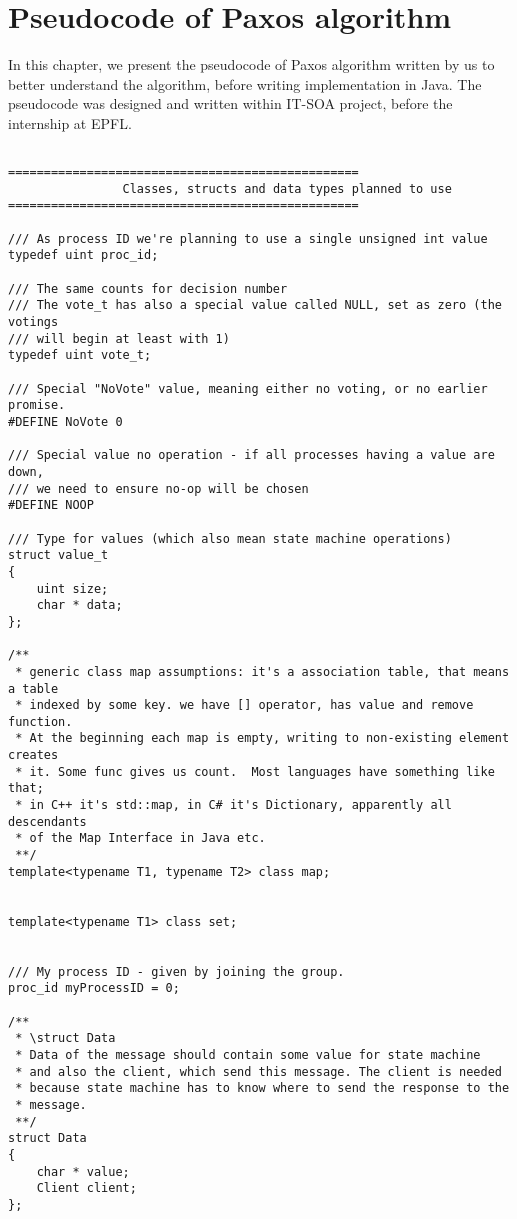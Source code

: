 \chapter{Pseudocode of Paxos algorithm}

In this chapter, we present the pseudocode of Paxos algorithm written by us to
better understand the algorithm, before writing implementation in Java. The
pseudocode was designed and written within IT-SOA project, before the
internship at EPFL.

\begin{lstlisting}[frame=lines,caption=Pseudocode of Paxos algorithm]

=================================================
                Classes, structs and data types planned to use
=================================================

/// As process ID we're planning to use a single unsigned int value
typedef uint proc_id;

/// The same counts for decision number
/// The vote_t has also a special value called NULL, set as zero (the votings
/// will begin at least with 1)
typedef uint vote_t;

/// Special "NoVote" value, meaning either no voting, or no earlier promise.
#DEFINE NoVote 0

/// Special value no operation - if all processes having a value are down,
/// we need to ensure no-op will be chosen
#DEFINE NOOP

/// Type for values (which also mean state machine operations)
struct value_t
{
	uint size;
	char * data;
};

/**
 * generic class map assumptions: it's a association table, that means a table
 * indexed by some key. we have [] operator, has value and remove function.
 * At the beginning each map is empty, writing to non-existing element creates
 * it. Some func gives us count.  Most languages have something like that;
 * in C++ it's std::map, in C# it's Dictionary, apparently all descendants
 * of the Map Interface in Java etc.
 **/
template<typename T1, typename T2> class map;


template<typename T1> class set;


/// My process ID - given by joining the group.
proc_id myProcessID = 0;

/**
 * \struct Data
 * Data of the message should contain some value for state machine 
 * and also the client, which send this message. The client is needed
 * because state machine has to know where to send the response to the 
 * message.
 **/
struct Data
{
	char * value;
	Client client;
};


\end{lstlisting}
